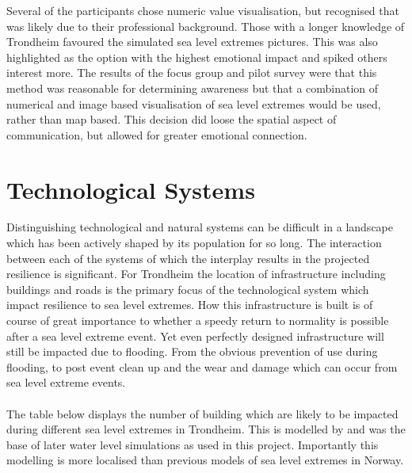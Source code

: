 Several of the participants chose numeric value visualisation, but recognised that was likely due to their professional background. Those with a longer knowledge of Trondheim favoured the simulated sea level extremes pictures. This was also highlighted as the option with the highest emotional impact and spiked others interest more. The results of the focus group and pilot survey were that this method was reasonable for determining awareness but that a combination of numerical and image based visualisation of sea level extremes would be used, rather than map based. This decision did loose the spatial aspect of communication, but allowed for greater emotional connection.

\section{Technological Systems}

Distinguishing technological and natural systems can be difficult in a landscape which has been actively shaped by its population for so long. The interaction between each of the systems of which the interplay results in the projected resilience is significant. For Trondheim the location of infrastructure including buildings and roads is the primary focus of the technological system which impact resilience to sea level extremes. How this infrastructure is built is of course of great importance to whether a speedy return to normality is possible after a sea level extreme event. Yet even perfectly designed infrastructure will still be impacted due to flooding. From the obvious  prevention of use during flooding, to post event clean up and the wear and damage which can occur from sea level extreme events.
\paragraph{}
The table below displays the number of building which are likely to be impacted during different sea level extremes in Trondheim. This is modelled by \cite{kartverket_se_2021} and was the base of later water level simulations as used in this project. Importantly this modelling is more localised than previous models of sea level extremes in Norway.

